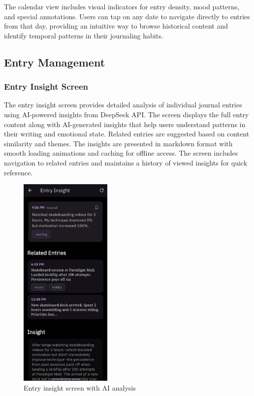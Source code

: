 The calendar view includes visual indicators for entry density, mood patterns, and special annotations. Users can tap on any date to navigate directly to entries from that day, providing an intuitive way to browse historical content and identify temporal patterns in their journaling habits.

\subsection{Entry Management}

\subsubsection{Entry Insight Screen}

The entry insight screen provides detailed analysis of individual journal entries using AI-powered insights from DeepSeek API. The screen displays the full entry content along with AI-generated insights that help users understand patterns in their writing and emotional state. Related entries are suggested based on content similarity and themes. The insights are presented in markdown format with smooth loading animations and caching for offline access. The screen includes navigation to related entries and maintains a history of viewed insights for quick reference.

\nopagebreak
\begin{figure}[H]
\centering
\includegraphics[width=0.4\textwidth]{files/imgs/prototype/entry_insight_screen.jpeg}
\caption{Entry insight screen with AI analysis}
\label{fig:entry-insight-screen}
\end{figure}

